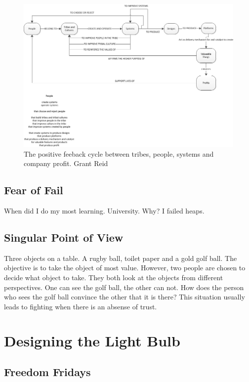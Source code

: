 \documentclass[conference]{IEEEtran}
\begin{document}
\begin{figure}[!t]
\centering
\includegraphics[width=\textwidth]{SystemCreation.png}
\caption{The positive feeback cycle between tribes, people, systems and company profit. \textcopyright Grant Reid}
\label{fig:peoplesystems}
\end{figure}


\subsection{Fear of Fail}
When did I do my most learning. University. Why? I failed heaps.



\subsection{Singular Point of View}
Three objects on a table. A rugby ball, toilet paper and a gold golf ball. The
objective is to take the object of most value. However, two people are chosen to
decide what object to take. They both look at the objects from different
perspectives. One can see the golf ball, the other can not. How does the person
who sees the golf ball convince the other that it is there? This situation
usually leads to fighting when there is an absense of trust.

\section{Designing the Light Bulb}

\subsection{Freedom Fridays}
\end{document}
